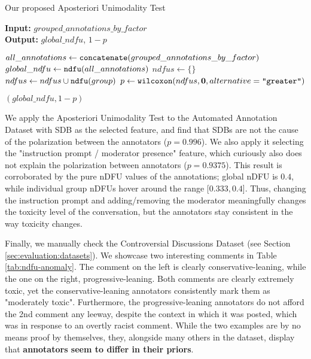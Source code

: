 \begin{algorithm}
	\caption{Our proposed Aposteriori Unimodality Test}
	\label{al:aposteriori_unimodality}
	\hspace*{\algorithmicindent} \textbf{Input:} $grouped\_annotations\_by\_factor$  \\
	\hspace*{\algorithmicindent} \textbf{Output:} $global\_ndfu$, $1 - p$ 
	\begin{algorithmic}[1]
		\State $all\_annotations \gets \texttt{concatenate}(grouped\_annotations\_by\_factor)$ 
		\State $global\_ndfu \gets \texttt{ndfu}(all\_annotations)$ 
		\State
		\State $ndfus \gets \{\}$
		\State $ndfus \gets  ndfus \cup \texttt{ndfu}(group)$ 
		\EndFor
		\State
		\State $p \gets \texttt{wilcoxon}(ndfus, \mathbf{0}, alternative=\texttt{"greater"})$
		
		\State \Return $(global\_ndfu, 1 - p)$
	\end{algorithmic}
\end{algorithm}

We apply the Aposteriori Unimodality Test to the Automated Annotation Dataset with \ac{SDB} as the selected feature, and find that \acp{SDB} are not the cause of the polarization between the annotators ($p=0.996$). We also apply it selecting the "instruction prompt / moderator presence" feature, which curiously also does not explain the polarization between annotators ($p=0.9375$). This result is corroborated by the pure \ac{nDFU} values of the annotations; global \ac{nDFU} is $0.4$, while individual group \acp{nDFU} hover around the range [$0.333, 0.4$]. Thus, changing the instruction prompt and adding/removing the moderator meaningfully changes the toxicity level of the conversation, but the annotators stay consistent in the way toxicity changes.


Finally, we manually check the Controversial Discussions Dataset (see Section \ref{sec:evaluation:datasets}). We showcase two interesting comments in Table \ref{tab:ndfu-anomaly}. The comment on the left is clearly conservative-leaning, while the one on the right, progressive-leaning. Both comments are clearly extremely toxic, yet the conservative-leaning annotators consistently mark them as "moderately toxic". Furthermore, the progressive-leaning annotators do not afford the 2nd comment any leeway, despite the context in which it was posted, which was in response to an overtly racist comment. While the two examples are by no means proof by themselves, they, alongside many others in the dataset, display that \textbf{annotators seem to differ in their priors}.



